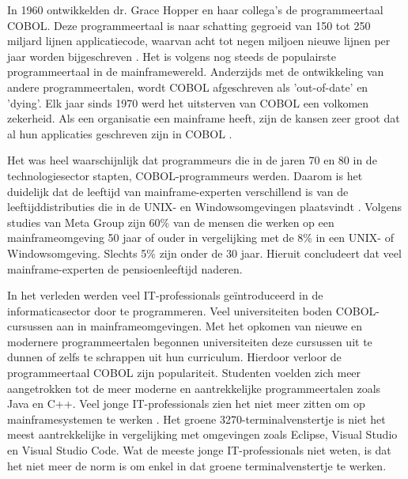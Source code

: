 In 1960 ontwikkelden dr. Grace Hopper en haar collega's de programmeertaal COBOL. Deze programmeertaal is naar schatting gegroeid van 150 tot 250 miljard lijnen applicatiecode, waarvan acht tot negen miljoen nieuwe lijnen per jaar worden bijgeschreven \autocite{Waites2013}. Het is volgens \textcite{Waites2013} nog steeds de populairste programmeertaal in de mainframewereld. Anderzijds met de ontwikkeling van andere programmeertalen, wordt COBOL afgeschreven als 'out-of-date' en 'dying'. Elk jaar sinds 1970 werd het uitsterven van COBOL een volkomen zekerheid. Als een organisatie een mainframe heeft, zijn de kansen zeer groot dat al hun applicaties geschreven zijn in COBOL \autocite{Waites2013}. 

Het was heel waarschijnlijk dat programmeurs die in de jaren 70 en 80 in de technologiesector stapten, COBOL-programmeurs werden. Daarom is het duidelijk dat de leeftijd van mainframe-experten verschillend is van de leeftijddistributies die in de UNIX- en Windowsomgevingen plaatsvindt \autocite{McGirr2004}. Volgens studies van Meta Group zijn 60\% van de mensen die werken op een mainframeomgeving  50 jaar of ouder in vergelijking met de 8\% in een UNIX- of Windowsomgeving. Slechts 5\% zijn onder de 30 jaar. Hieruit concludeert  \textcite{McGirr2004} dat veel mainframe-experten de pensioenleeftijd naderen. 

In het verleden werden veel IT-professionals geïntroduceerd in de informaticasector door te programmeren. Veel universiteiten boden COBOL-cursussen aan in mainframeomgevingen. Met het opkomen van nieuwe en modernere programmeertalen begonnen universiteiten deze cursussen uit te dunnen of zelfs te schrappen uit hun curriculum. Hierdoor verloor de programmeertaal COBOL zijn populariteit. Studenten voelden zich meer aangetrokken tot de meer moderne en aantrekkelijke programmeertalen zoals Java en C++. Veel jonge IT-professionals zien het niet meer zitten om op mainframesystemen te werken \autocite{Mullins2016}. Het groene 3270-terminalvenstertje is niet het meest aantrekkelijke in vergelijking met omgevingen zoals Eclipse, Visual Studio en Visual Studio Code. Wat de meeste jonge IT-professionals niet weten, is dat het niet meer de norm is om enkel in dat groene terminalvenstertje te werken. 

